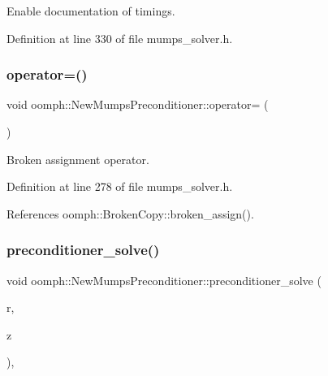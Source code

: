 Enable documentation of timings. 



Definition at line 330 of file mumps\+\_\+solver.\+h.

\mbox{\label{classoomph_1_1NewMumpsPreconditioner_acc2b3a72965b6e18e584d0f9722bbd70}} 
\subsubsection{\texorpdfstring{operator=()}{operator=()}}
{\footnotesize\ttfamily void oomph\+::\+New\+Mumps\+Preconditioner\+::operator= (\begin{DoxyParamCaption}\item[{const \hyperlink{classoomph_1_1NewMumpsPreconditioner}{New\+Mumps\+Preconditioner} \&}]{ }\end{DoxyParamCaption})\hspace{0.3cm}{\ttfamily [inline]}}



Broken assignment operator. 



Definition at line 278 of file mumps\+\_\+solver.\+h.



References oomph\+::\+Broken\+Copy\+::broken\+\_\+assign().

\mbox{\label{classoomph_1_1NewMumpsPreconditioner_a763a8297c031fab7f16b37eaf257aeb1}} 
\subsubsection{\texorpdfstring{preconditioner\+\_\+solve()}{preconditioner\_solve()}}
{\footnotesize\ttfamily void oomph\+::\+New\+Mumps\+Preconditioner\+::preconditioner\+\_\+solve (\begin{DoxyParamCaption}\item[{const \hyperlink{classoomph_1_1DoubleVector}{Double\+Vector} \&}]{r,  }\item[{\hyperlink{classoomph_1_1DoubleVector}{Double\+Vector} \&}]{z }\end{DoxyParamCaption})\hspace{0.3cm}{\ttfamily [inline]}, {\ttfamily [virtual]}}



